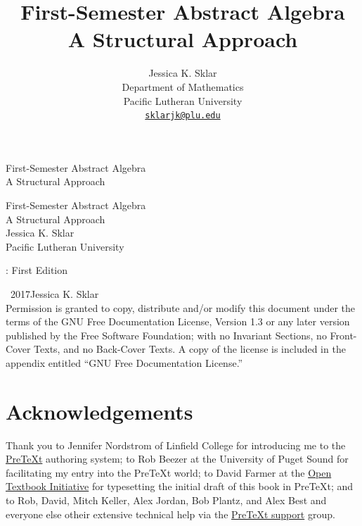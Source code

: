 \documentclass[10pt,]{book}
\title{First-Semester Abstract Algebra\\
{\large A Structural Approach}}
\author{Jessica K. Sklar\\
Department of Mathematics\\
Pacific Lutheran University\\
\href{mailto:sklarjk@plu.edu}{\nolinkurl{sklarjk@plu.edu}}
}
\date{}
\theoremstyle{plain}
\theoremstyle{definition}
\theoremstyle{definition}
\theoremstyle{definition}
\theoremstyle{definition}
\numberwithin{equation}{section}
\begin{document}
\frontmatter
\thispagestyle{empty}
{\centering
\vspace*{0.28\textheight}
{\Huge First-Semester Abstract Algebra}\\[2\baselineskip]
{\LARGE A Structural Approach}\\
}
\clearpage
\thispagestyle{empty}
\null%
\clearpage
\thispagestyle{empty}
{\centering
\vspace*{0.14\textheight}
{\Huge First-Semester Abstract Algebra}\\[\baselineskip]
{\LARGE A Structural Approach}\\[3\baselineskip]
{\Large Jessica K. Sklar}\\[0.5\baselineskip]
{\Large Pacific Lutheran University}\\}
\clearpage
\thispagestyle{empty}
: First Edition\par\medskip
\noindent\textcopyright\ 2017\quad{}Jessica K. Sklar\\[0.5\baselineskip]
Permission is granted to copy, distribute and/or modify this document under the terms of the GNU Free Documentation License, Version 1.3 or any later version published by the Free Software Foundation; with no Invariant Sections, no Front-Cover Texts, and no Back-Cover Texts.  A copy of the license is included in the appendix entitled ``GNU Free Documentation License.''\par\medskip
{}
\null\clearpage
\chapter*{Acknowledgements}\label{acknowledgement-1}
Thank you to Jennifer Nordstrom of Linfield College for introducing me to the \href{http://mathbook.pugetsound.edu}{PreTeXt} authoring system; to Rob Beezer at the University of Puget Sound for facilitating my entry into the PreTeXt world;  to David Farmer at the \href{https://aimath.org/textbooks/}{ Open Textbook Initiative} for typesetting the initial draft of this book in PreTeXt; and to Rob, David, Mitch Keller, Alex Jordan, Bob Plantz, and Alex Best and everyone else otheir extensive technical help via the \href{https://groups.google.com/forum/?fromgroups\#!forum/pretext-support}{PreTeXt support} group.%
\end{document}

